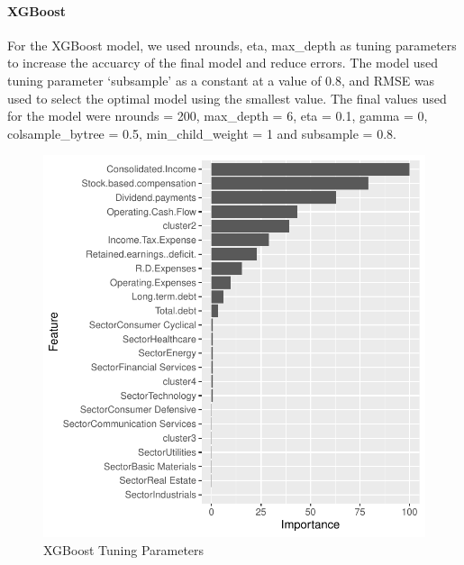 \documentclass[11pt,]{article}
\begin{document}
\hypertarget{xgboost}{%
\paragraph{\texorpdfstring{\textbf{XGBoost}\\
}{XGBoost }}\label{xgboost}}

For the XGBoost model, we used nrounds, eta, max\_depth as tuning
parameters to increase the accuarcy of the final model and reduce
errors. The model used tuning parameter `subsample' as a constant at a
value of 0.8, and RMSE was used to select the optimal model using the
smallest value. The final values used for the model were nrounds = 200,
max\_depth = 6, eta = 0.1, gamma = 0, colsample\_bytree = 0.5,
min\_child\_weight = 1 and subsample = 0.8.

\begin{figure}

{\centering \includegraphics{stock_analysis_files/figure-latex/XGBoost-1} 

}

\caption{XGBoost Tuning Parameters}\label{fig:XGBoost-1}
\end{figure}
\end{document}
